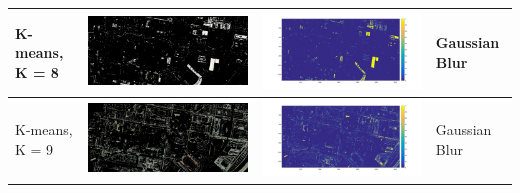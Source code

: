 \documentclass[fleqn,10pt]{SelfArx} %
\begin{document}
\begin{table}
\begin{tabular}{>{\centering\arraybackslash}M{8mm}cc>{\centering\arraybackslash}M{20mm}}
K-means, K = 8 & \includegraphics[clip,scale=0.07]{8rgb.jpg} & \includegraphics[trim={6cm 2.5cm 4.5cm 1.6cm},clip,scale=0.18]{8.jpg} & \vspace{-3cm}Gaussian Blur \\ 
\midrule 
\vspace{-3cm}
\hspace{-0.6cm}
K-means, K = 9 & \includegraphics[clip,scale=0.07]{9rgb.jpg} & \includegraphics[trim={6cm 2.5cm 4.5cm 1.6cm},clip,scale=0.18]{9.jpg} & \vspace{-3cm}Gaussian Blur \\ 

\end{tabular}
\end{table}
\end{document}
